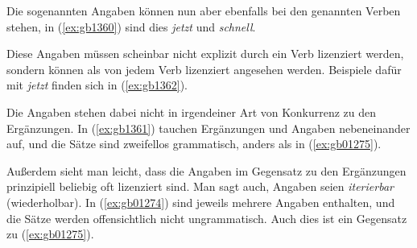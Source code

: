\begin{exe}
  \ex\label{ex:gb01275}
  \begin{xlist}
  \end{xlist}
\end{exe}

Die sogenannten Angaben können nun aber ebenfalls bei den genannten Verben stehen, in (\ref{ex:gb1360}) sind dies \textit{jetzt} und \textit{schnell}.

\begin{exe}
  \ex\label{ex:gb1360}
  \begin{xlist}
  \end{xlist}
\end{exe}

Diese Angaben müssen scheinbar nicht explizit durch ein Verb lizenziert werden, sondern können als von jedem Verb lizenziert angesehen werden.
Beispiele dafür mit \textit{jetzt} finden sich in (\ref{ex:gb1362}).

\begin{exe}
  \ex\label{ex:gb1362}
  \begin{xlist}
  \end{xlist}
\end{exe}

Die Angaben stehen dabei nicht in irgendeiner Art von Konkurrenz zu den Ergänzungen.
In (\ref{ex:gb1361}) tauchen Ergänzungen und Angaben nebeneinander auf, und die Sätze sind zweifellos grammatisch, anders als in (\ref{ex:gb01275}).

\begin{exe}
  \ex\label{ex:gb1361}
  \begin{xlist}
  \end{xlist}
\end{exe}

Außerdem sieht man leicht, dass die Angaben im Gegensatz zu den Ergänzungen prinzipiell beliebig oft lizenziert sind.
Man sagt auch, Angaben seien \textit{iterierbar} (wiederholbar).
%
In (\ref{ex:gb01274}) sind jeweils mehrere Angaben enthalten, und die Sätze werden offensichtlich nicht ungrammatisch.
Auch dies ist ein Gegensatz zu (\ref{ex:gb01275}).

